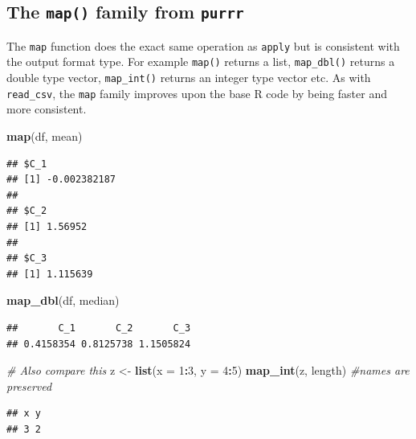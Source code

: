 \documentclass[12pt,]{article}
\newenvironment{Shaded}{\begin{snugshade}}{\end{snugshade}}
\newcommand{\KeywordTok}[1]{\textcolor[rgb]{0.13,0.29,0.53}{\textbf{#1}}}
\newcommand{\DataTypeTok}[1]{\textcolor[rgb]{0.13,0.29,0.53}{#1}}
\newcommand{\DecValTok}[1]{\textcolor[rgb]{0.00,0.00,0.81}{#1}}
\newcommand{\StringTok}[1]{\textcolor[rgb]{0.31,0.60,0.02}{#1}}
\newcommand{\CommentTok}[1]{\textcolor[rgb]{0.56,0.35,0.01}{\textit{#1}}}
\newcommand{\OperatorTok}[1]{\textcolor[rgb]{0.81,0.36,0.00}{\textbf{#1}}}
\newcommand{\NormalTok}[1]{#1}
\begin{document}
\subsection{\texorpdfstring{The \texttt{map()} family from
\texttt{purrr}}{The map() family from purrr}}\label{the-map-family-from-purrr}

The \texttt{map} function does the exact same operation as
\texttt{apply} but is consistent with the output format type. For
example \texttt{map()} returns a list, \texttt{map\_dbl()} returns a
double type vector, \texttt{map\_int()} returns an integer type vector
etc. As with \texttt{read\_csv}, the \texttt{map} family improves upon
the base R code by being faster and more consistent.

\begin{Shaded}
\begin{Highlighting}[]
\KeywordTok{map}\NormalTok{(df, mean)}
\end{Highlighting}
\end{Shaded}

\begin{verbatim}
## $C_1
## [1] -0.002382187
## 
## $C_2
## [1] 1.56952
## 
## $C_3
## [1] 1.115639
\end{verbatim}

\begin{Shaded}
\begin{Highlighting}[]
\KeywordTok{map_dbl}\NormalTok{(df, median)}
\end{Highlighting}
\end{Shaded}

\begin{verbatim}
##       C_1       C_2       C_3 
## 0.4158354 0.8125738 1.1505824
\end{verbatim}

\begin{Shaded}
\begin{Highlighting}[]
\CommentTok{# Also compare this}
\NormalTok{z <-}\StringTok{ }\KeywordTok{list}\NormalTok{(}\DataTypeTok{x =} \DecValTok{1}\OperatorTok{:}\DecValTok{3}\NormalTok{, }\DataTypeTok{y =} \DecValTok{4}\OperatorTok{:}\DecValTok{5}\NormalTok{)}
\KeywordTok{map_int}\NormalTok{(z, length) }\CommentTok{#names are preserved}
\end{Highlighting}
\end{Shaded}

\begin{verbatim}
## x y 
## 3 2
\end{verbatim}
\end{document}
